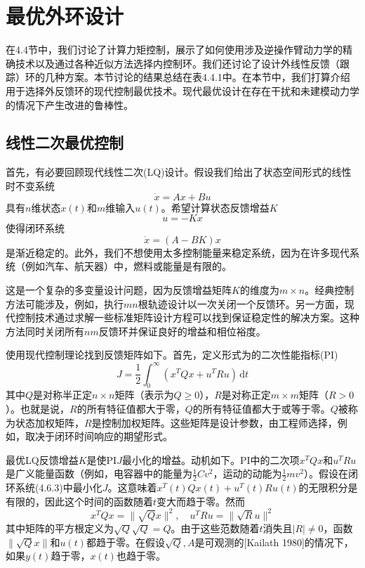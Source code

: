 \documentclass[UTF8]{ctexart}
\theoremstyle{definition}
\newcommand{\dd}{\mathrm{d}}
\begin{document}
\section{最优外环设计}

在4.4节中，我们讨论了计算力矩控制，展示了如何使用涉及逆操作臂动力学的精确技术以及通过各种近似方法选择内控制环。我们还讨论了设计外线性反馈（跟踪）环的几种方案。本节讨论的结果总结在表4.4.1中。在本节中，我们打算介绍用于选择外反馈环的现代控制最优技术。现代最优设计在存在干扰和未建模动力学的情况下产生改进的鲁棒性。

\subsection{线性二次最优控制}

首先，有必要回顾现代线性二次(LQ)设计。假设我们给出了状态空间形式的线性时不变系统
\begin{equation}
    \dot{x} = Ax + Bu
\end{equation}
具有$n$维状态$x(t)$和$m$维输入$u(t)$。希望计算状态反馈增益$K$
\begin{equation}
    u = -Kx
\end{equation}
使得闭环系统
\begin{equation}
    \dot{x} = (A - BK)x
\end{equation}
是渐近稳定的。此外，我们不想使用太多控制能量来稳定系统，因为在许多现代系统（例如汽车、航天器）中，燃料或能量是有限的。

这是一个复杂的多变量设计问题，因为反馈增益矩阵$K$的维度为$m \times n$。经典控制方法可能涉及，例如，执行$mn$根轨迹设计以一次关闭一个反馈环。另一方面，现代控制技术通过求解一些标准矩阵设计方程可以找到保证稳定性的解决方案。这种方法同时关闭所有$nm$反馈环并保证良好的增益和相位裕度。

使用现代控制理论找到反馈矩阵如下。首先，定义形式为的二次性能指标(PI)
\begin{equation}
    J = \frac{1}{2}\int_0^\infty (x^TQx + u^TRu)\,\dd t
\end{equation}
其中$Q$是对称半正定$n \times n$矩阵（表示为$Q \geq 0$），$R$是对称正定$m \times m$矩阵（$R > 0$）。也就是说，$R$的所有特征值都大于零，$Q$的所有特征值都大于或等于零。$Q$被称为状态加权矩阵，$R$是控制加权矩阵。这些矩阵是设计参数，由工程师选择，例如，取决于闭环时间响应的期望形式。

最优LQ反馈增益$K$是使PI$J$最小化的增益。动机如下。PI中的二次项$x^TQx$和$u^TRu$是广义能量函数（例如，电容器中的能量为$\frac{1}{2}Cv^2$，运动的动能为$\frac{1}{2}mv^2$）。假设在闭环系统(4.6.3)中最小化$J$。这意味着$x^T(t)Qx(t) + u^T(t)Ru(t)$的无限积分是有限的，因此这个时间的函数随着$t$变大而趋于零。然而
\begin{equation*}
    x^TQx = \|\sqrt{Q}x\|^2, \quad u^TRu = \|\sqrt{R}u\|^2
\end{equation*}
其中矩阵的平方根定义为$\sqrt{Q}\sqrt{Q} = Q$。由于这些范数随着$t$消失且$|R| \neq 0$，函数$\|\sqrt{Q}x\|$和$u(t)$都趋于零。在假设$\sqrt{Q}, A$是可观测的[Kailath 1980]的情况下，如果$y(t)$趋于零，$x(t)$也趋于零。
\end{document}
